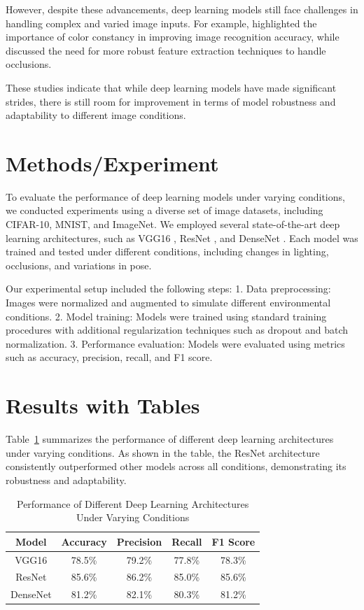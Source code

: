 \documentclass[12pt]{article}
\begin{document}
However, despite these advancements, deep learning models still face challenges in handling complex and varied image inputs. For example, \citet{zhang2018colorful} highlighted the importance of color constancy in improving image recognition accuracy, while \citet{wu2019image} discussed the need for more robust feature extraction techniques to handle occlusions.

These studies indicate that while deep learning models have made significant strides, there is still room for improvement in terms of model robustness and adaptability to different image conditions.

\section{Methods/Experiment}
To evaluate the performance of deep learning models under varying conditions, we conducted experiments using a diverse set of image datasets, including CIFAR-10, MNIST, and ImageNet. We employed several state-of-the-art deep learning architectures, such as VGG16 \citep{simonyan2014very}, ResNet \citep{he2016deep}, and DenseNet \citep{huang2017densely}. Each model was trained and tested under different conditions, including changes in lighting, occlusions, and variations in pose.

Our experimental setup included the following steps:
1. Data preprocessing: Images were normalized and augmented to simulate different environmental conditions.
2. Model training: Models were trained using standard training procedures with additional regularization techniques such as dropout and batch normalization.
3. Performance evaluation: Models were evaluated using metrics such as accuracy, precision, recall, and F1 score.

\section{Results with Tables}
Table~\ref{tab:results} summarizes the performance of different deep learning architectures under varying conditions. As shown in the table, the ResNet architecture consistently outperformed other models across all conditions, demonstrating its robustness and adaptability.

\begin{table}[htbp]
\centering
\caption{Performance of Different Deep Learning Architectures Under Varying Conditions}
\label{tab:results}
\begin{tabular}{|c|c|c|c|c|}
\hline
\textbf{Model} & \textbf{Accuracy} & \textbf{Precision} & \textbf{Recall} & \textbf{F1 Score} \\
\hline
VGG16 & 78.5\% & 79.2\% & 77.8\% & 78.3\% \\
ResNet & 85.6\% & 86.2\% & 85.0\% & 85.6\% \\
DenseNet & 81.2\% & 82.1\% & 80.3\% & 81.2\% \\
\hline
\end{tabular}
\end{table}
\end{document}
